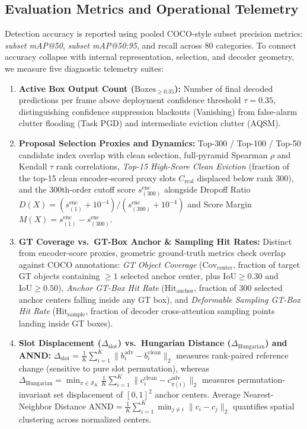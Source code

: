 \documentclass[preprint,10pt]{elsarticle}
\begin{document}
\subsection{Evaluation Metrics and Operational Telemetry}
\label{sec:statistical_metrics}
Detection accuracy is reported using pooled COCO-style subset precision metrics: \textit{subset mAP@50}, \textit{subset mAP@50:95}, and recall across 80 categories. To connect accuracy collapse with internal representation, selection, and decoder geometry, we measure five diagnostic telemetry suites:
\begin{enumerate}
    \item \textbf{Active Box Output Count ($\text{Boxes}_{\ge 0.35}$):} Number of final decoded predictions per frame above deployment confidence threshold $\tau = 0.35$, distinguishing confidence suppression blackouts (Vanishing) from false-alarm clutter flooding (Task PGD) and intermediate eviction clutter (AQSM).
    \item \textbf{Proposal Selection Proxies and Dynamics:} Top-300 / Top-100 / Top-50 candidate index overlap with clean selection, full-pyramid Spearman $\rho$ and Kendall $\tau$ rank correlations, \textit{Top-15 High-Score Clean Eviction} (fraction of the top-15 clean encoder-scored proxy slots $C_{\mathrm{real}}$ displaced below rank 300), and the 300th-order cutoff score $s_{(300)}^{\mathrm{enc}}$ alongside Dropoff Ratio $D(X) = (s_{(1)}^{\mathrm{enc}} + 10^{-4}) / (s_{(300)}^{\mathrm{enc}} + 10^{-4})$ and Score Margin $M(X) = s_{(1)}^{\mathrm{enc}} - s_{(300)}^{\mathrm{enc}}$.
    \item \textbf{GT Coverage vs.\ GT-Box Anchor \& Sampling Hit Rates:} Distinct from encoder-score proxies, geometric ground-truth metrics check overlap against COCO annotations: \textit{GT Object Coverage} ($\text{Cov}_{\mathrm{center}}$, fraction of target GT objects containing $\ge 1$ selected anchor center, plus $\text{IoU} \ge 0.30$ and $\text{IoU} \ge 0.50$), \textit{Anchor GT-Box Hit Rate} ($\text{Hit}_{\mathrm{anchor}}$, fraction of 300 selected anchor centers falling inside any GT box), and \textit{Deformable Sampling GT-Box Hit Rate} ($\text{Hit}_{\mathrm{sample}}$, fraction of decoder cross-attention sampling points landing inside GT boxes).
    \item \textbf{Slot Displacement ($\Delta_{\mathrm{slot}}$) vs.\ Hungarian Distance ($\Delta_{\mathrm{Hungarian}}$) and ANND:} $\Delta_{\mathrm{slot}} = \frac{1}{K} \sum_{i=1}^K \|b_i^{\mathrm{adv}} - b_i^{\mathrm{clean}}\|_2$ measures rank-paired reference change (sensitive to pure slot permutation), whereas $\Delta_{\mathrm{Hungarian}} = \min_{\pi \in \mathcal{S}_K} \frac{1}{K} \sum_{i=1}^K \|c_i^{\mathrm{clean}} - c_{\pi(i)}^{\mathrm{adv}}\|_2$ measures permutation-invariant set displacement of $[0,1]^2$ anchor centers. Average Nearest-Neighbor Distance $\mathrm{ANND} = \frac{1}{K} \sum_{i=1}^K \min_{j \ne i} \|c_i - c_j\|_2$ quantifies spatial clustering across normalized centers.

\end{enumerate}
\end{document}
